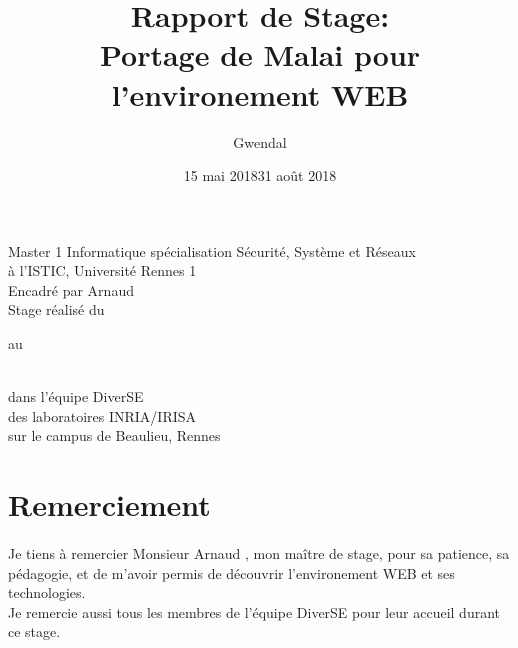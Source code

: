 \documentclass[11pt, a4paper, pdftex]{article}
\begin{document}
    \title{Rapport de Stage: \\ Portage de Malai pour l'environement WEB}
    \author{Gwendal }

    \maketitle
    \thispagestyle{empty}
    \begin{center}
        \vspace{0.25cm} Master 1 Informatique spécialisation Sécurité, Système et Réseaux \\ à l'ISTIC, Université Rennes 1 \\
        \vspace{0.25cm} Encadré par Arnaud  \\
        \vspace{0.25cm} Stage réalisé du \date{15 mai 2018} au \date{31 août 2018} \\ \vspace{0.25cm} dans l'équipe DiverSE \\ des laboratoires INRIA/IRISA \\ sur le campus de Beaulieu, Rennes
    \end{center}


    \newpage
    \setcounter{page}{1}
    \pagestyle{fancy}
    \renewcommand{\headrulewidth}{1pt}
    \fancyhead[C]{\leftmark}
    \fancyfoot[C]{\thepage/\pageref{LastPage}}
    \section*{Remerciement}\label{sec:remerciement}
    \paragraph{}
    Je tiens à remercier Monsieur Arnaud , mon maître de stage, pour sa patience, sa pédagogie, et de m'avoir permis de découvrir l'environement WEB et ses technologies. \\
    Je remercie aussi tous les membres de l'équipe DiverSE pour leur accueil durant ce stage.
    \newpage
\end{document}
